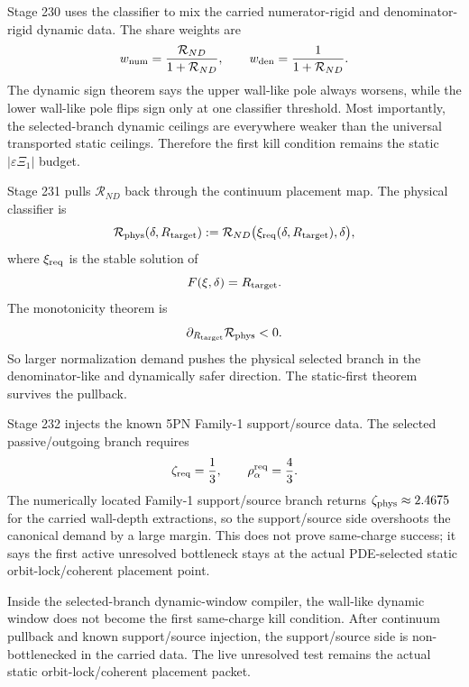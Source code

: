 Stage 230 uses the classifier to mix the carried numerator-rigid and denominator-rigid dynamic data.  The share weights are
\begin{equation}
\label{eq:app-part07-share-weights}
w_{\rm num}=\frac{\mathcal R_{ND}}{1+\mathcal R_{ND}},
\qquad
w_{\rm den}=\frac{1}{1+\mathcal R_{ND}}.
\end{equation}
The dynamic sign theorem says the upper wall-like pole always worsens, while the lower wall-like pole flips sign only at one classifier threshold.  Most importantly, the selected-branch dynamic ceilings are everywhere weaker than the universal transported static ceilings.  Therefore the first kill condition remains the static \(|\varepsilon\Xi_1|\) budget.

Stage 231 pulls \(\mathcal R_{ND}\) back through the continuum placement map.  The physical classifier is
\begin{equation}
\label{eq:app-part07-physical-classifier}
\mathcal R_{\rm phys}(\delta,R_{\rm target})
:=
\mathcal R_{ND}\bigl(\xi_{\rm req}(\delta,R_{\rm target}),\delta\bigr),
\end{equation}
where \(\xi_{\rm req}\) is the stable solution of
\begin{equation}
\label{eq:app-part07-f-equals-rtarget}
F(\xi,\delta)=R_{\rm target}.
\end{equation}
The monotonicity theorem is
\begin{equation}
\label{eq:app-part07-rphys-monotonic}
\partial_{R_{\rm target}}\mathcal R_{\rm phys}<0.
\end{equation}
So larger normalization demand pushes the physical selected branch in the denominator-like and dynamically safer direction.  The static-first theorem survives the pullback.

Stage 232 injects the known 5PN Family-1 support/source data.  The selected passive/outgoing branch requires
\begin{equation}
\label{eq:app-part07-zeta-req-rho-alpha}
\zeta_{\rm req}=\frac13,
\qquad
\rho_{\alpha}^{\rm req}=\frac43.
\end{equation}
The numerically located Family-1 support/source branch returns \(\zeta_{\rm phys}\approx2.4675\) for the carried wall-depth extractions, so the support/source side overshoots the canonical demand by a large margin.  This does not prove same-charge success; it says the first active unresolved bottleneck stays at the actual PDE-selected static orbit-lock/coherent placement point.

\begin{theorem}
\label{thm:app-part07-selected-static-first}
Inside the selected-branch dynamic-window compiler, the wall-like dynamic window does not become the first same-charge kill condition.  After continuum pullback and known support/source injection, the support/source side is non-bottlenecked in the carried data.  The live unresolved test remains the actual static orbit-lock/coherent placement packet.
\end{theorem}

